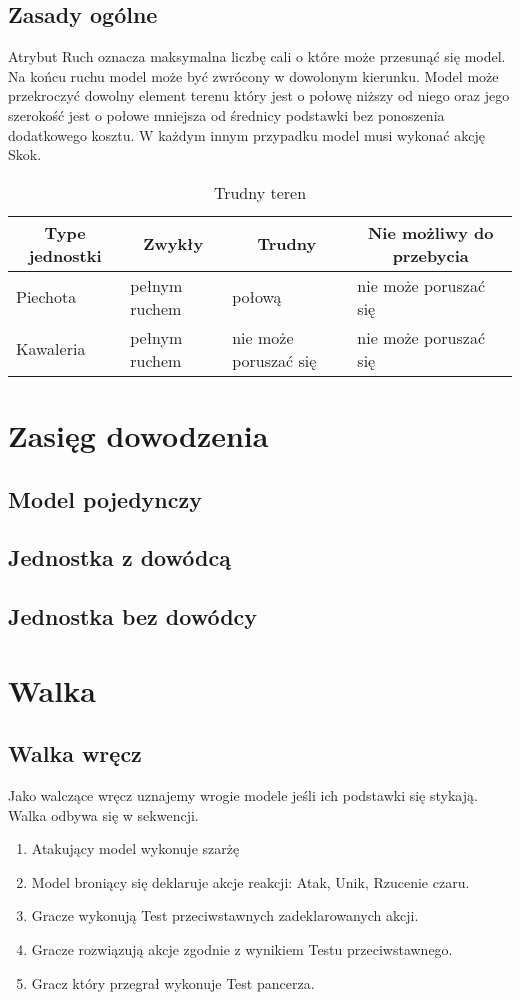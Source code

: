 \subsection{Zasady ogólne}
Atrybut Ruch oznacza maksymalna liczbę cali o które może przesunąć się model. Na końcu ruchu model może być zwrócony w dowolonym kierunku. Model może przekroczyć dowolny element terenu który jest o połowę niższy od niego oraz jego szerokość jest o połowe mniejsza od średnicy podstawki bez ponoszenia dodatkowego kosztu. W każdym innym przypadku model musi wykonać akcję Skok. 

\begin{table}[h]
\caption{Trudny teren}
\begin{tabular}{|l|l|l|l|}
\hline
\multicolumn{1}{c}{Type jednostki} & \multicolumn{1}{c}{Zwykły} & \multicolumn{1}{c}{Trudny} & \multicolumn{1}{c}{Nie możliwy do przebycia} \\ \hline
Piechota & pełnym ruchem & połową & nie może poruszać się \\ \hline
Kawaleria & pełnym ruchem & nie może poruszać się & nie może poruszać się \\ \hline
\end{tabular}

\end{table}

\section{Zasięg dowodzenia}
\subsection{Model pojedynczy}

\subsection{Jednostka z dowódcą}

\subsection{Jednostka bez dowódcy}


\section{Walka}
\subsection{Walka wręcz}
Jako walczące wręcz uznajemy wrogie modele jeśli ich podstawki się stykają. Walka odbywa się w sekwencji.
\begin{enumerate}
    \item Atakujący model wykonuje szarżę
    \item Model broniący się deklaruje akcje reakcji: Atak, Unik, Rzucenie czaru. 
    \item Gracze wykonują Test przeciwstawnych zadeklarowanych akcji.
    \item Gracze rozwiązują akcje zgodnie z wynikiem Testu przeciwstawnego.
    \item Gracz który przegrał wykonuje Test pancerza.
\end{enumerate}
